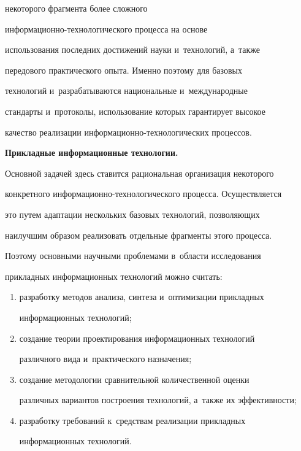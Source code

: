некоторого фрагмента более сложного  


ин\-фор\-ма\-ци\-он\-но-тех\-но\-ло\-ги\-че\-ско\-го процесса на основе 


использования по\-след\-них до\-сти\-же\-ний науки и~технологий, а~так\-же 


передового практического опыта. Именно поэтому для базовых 


технологий и~разрабатываются национальные и~международные 


стандарты и~протоколы, использование которых гарантирует высокое 


качество реализации ин\-фор\-ма\-ци\-он\-но-тех\-но\-ло\-ги\-че\-ских процессов.


   


\textbf{Прикладные информационные технологии.}


Основной задачей здесь ставится рациональная организация некоторого 


конкретного ин\-фор\-ма\-ци\-он\-но-тех\-но\-ло\-ги\-че\-ско\-го процесса. Осуществляется 


это путем адап\-та\-ции нескольких базовых технологий, поз\-во\-ля\-ющих 


наилучшим образом реализовать отдельные фрагменты этого процесса. 


Поэтому основными научными проб\-ле\-ма\-ми в~об\-ласти исследования 


при\-клад\-ных информационных технологий мож\-но считать:


   \begin{enumerate}[(1)]


\item разработку методов анализа, синтеза и~оптимизации прикладных 


информационных технологий;


\item создание теории проектирования информационных технологий 


различного вида и~практического назначения;


\item создание методологии сравнительной количественной оценки 


различных вариантов по\-стро\-ения технологий, а~так\-же их эф\-фек\-тив\-ности;


\item разработку требований к~средствам реализации при\-клад\-ных 


информационных технологий.


\end{enumerate}





